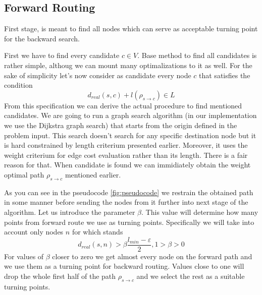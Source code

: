 \documentclass{ctuthesis}
\begin{document}
\subsection{Forward Routing} \label{sec:forward}
First stage, is meant to find all nodes which can serve as acceptable turning point for the backward search. \par 
First we have to find every candidate \(c \in V\). Base method to find all candidates is rather simple, althoug we can mount many optimalizations to it as well. For the sake of simplicity let's now consider as candidate every node \(c\) that satisfies the condition 
\begin{equation}
d_{real}(s, c) + l(\rho_{s \rightarrow c}) \in L
\end{equation}
From this specification we can derive the actual procedure to find mentioned candidates. We are going to run a graph search algorithm (in our implementation we use the Dijkstra\cite{dijkstra} graph search) that starts from the origin defined in the problem input. This search doesn't search for any specific destination node but it is hard constrained by length criterium presented earlier. Moreover, it uses the weight criterium for edge cost evaluation rather than its length. There is a fair reason for that. When candidate is found we can immidiately obtain the weight optimal path \(\rho_{s \rightarrow c}\) mentioned earlier. \par
As you can see in the pseudocode \ref{fig:pseudocode} we restrain the obtained path in some manner before sending the nodes from it further into next stage of the algorithm. Let us introduce the parameter \(\beta\). This value will determine how many points from forward route we use as turning points. Specifically we will take into account only nodes \(n\) for which stands 
\begin{equation}
d_{real}(s, n) > \beta\frac {l_{min}-\varepsilon} 2, 1 > \beta > 0
\end{equation}
For values of \(\beta\) closer to zero we get almost every node on the forward path and we use them as a turning point for backward routing. Values close to one will drop the whole first half of the path \(\rho_{s \rightarrow c}\) and we select the rest as a suitable turning points.
\end{document}
